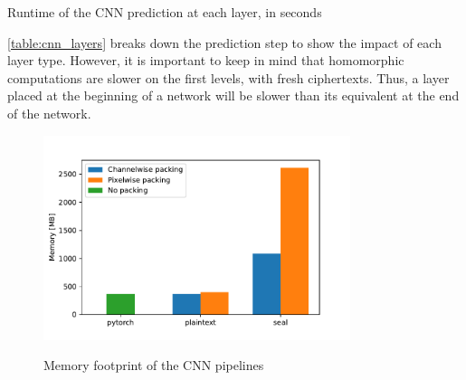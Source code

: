\documentclass[a4paper,11pt,oneside]{report}
\begin{document}
\begin{table}[h!]
  \begin{center}
    \caption{Runtime of the CNN prediction at each layer, in seconds}
    \label{table:cnn_layers}
  \end{center}
\end{table}

\autoref{table:cnn_layers} breaks down the prediction step to show the impact of each layer type. 
However, it is important to keep in mind that homomorphic computations are slower on the first levels, with fresh ciphertexts. 
Thus, a layer placed at the beginning of a network will be slower than its equivalent at the end of the network.


\begin{figure}[h!]
  \centering
  \caption{Memory footprint of the CNN pipelines}
  \includegraphics[width=0.8\textwidth]{figures/cnn_mem.pdf}
  \label{fig:cnn_memory}
\end{figure}
\end{document}
